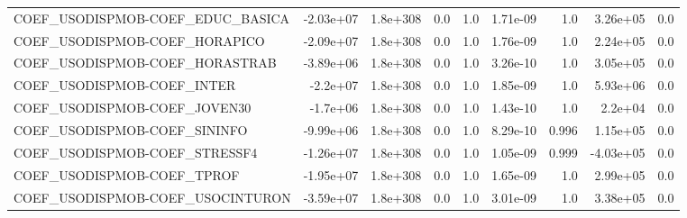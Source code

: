 \begin{tabular}{lrrrrrrrr}
COEF\_USODISPMOB-COEF\_EDUC\_BASICA  &   -2.03e+07 &     1.8e+308 &     0.0 &      1.0 &   1.71e-09 &         1.0 &     3.26e+05 &           0.0 \\
COEF\_USODISPMOB-COEF\_HORAPICO     &   -2.09e+07 &     1.8e+308 &     0.0 &      1.0 &   1.76e-09 &         1.0 &     2.24e+05 &           0.0 \\
COEF\_USODISPMOB-COEF\_HORASTRAB    &   -3.89e+06 &     1.8e+308 &     0.0 &      1.0 &   3.26e-10 &         1.0 &     3.05e+05 &           0.0 \\
COEF\_USODISPMOB-COEF\_INTER        &    -2.2e+07 &     1.8e+308 &     0.0 &      1.0 &   1.85e-09 &         1.0 &     5.93e+06 &           0.0 \\
COEF\_USODISPMOB-COEF\_JOVEN30      &    -1.7e+06 &     1.8e+308 &     0.0 &      1.0 &   1.43e-10 &         1.0 &      2.2e+04 &           0.0 \\
COEF\_USODISPMOB-COEF\_SININFO      &   -9.99e+06 &     1.8e+308 &     0.0 &      1.0 &   8.29e-10 &       0.996 &     1.15e+05 &           0.0 \\
COEF\_USODISPMOB-COEF\_STRESSF4     &   -1.26e+07 &     1.8e+308 &     0.0 &      1.0 &   1.05e-09 &       0.999 &    -4.03e+05 &           0.0 \\
COEF\_USODISPMOB-COEF\_TPROF        &   -1.95e+07 &     1.8e+308 &     0.0 &      1.0 &   1.65e-09 &         1.0 &     2.99e+05 &           0.0 \\
COEF\_USODISPMOB-COEF\_USOCINTURON  &   -3.59e+07 &     1.8e+308 &     0.0 &      1.0 &   3.01e-09 &         1.0 &     3.38e+05 &           0.0 \\
\bottomrule
\end{tabular}

